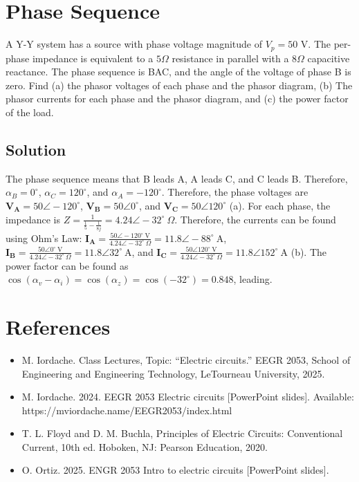 \documentclass{article}
\begin{document}
\section{Phase Sequence}
A Y-Y system has a source with phase voltage magnitude of $V_p = 50$ V. The per-phase impedance is equivalent to a $5\Omega$ resistance in parallel with a $8\Omega$ capacitive reactance. The phase sequence is BAC, and the angle of the voltage of phase B is zero. Find (a) the phasor voltages of each phase and the phasor diagram, (b) The phasor currents for each phase and the phasor diagram, and (c) the power factor of the load.
\subsection*{Solution}
The phase sequence means that B leads A, A leads C, and C leads B. Therefore, $\alpha_B = 0^\circ$, $\alpha_C = 120^\circ$, and $\alpha_A = -120^\circ$. Therefore, the phase voltages are $\bm{V_A} = 50\angle -120^\circ$, $\bm{V_B} = 50\angle 0^\circ$, and $\bm{V_C} = 50\angle 120^\circ$ (a). For each phase, the impedance is $Z = \frac{1}{\frac{1}{5} - \frac{1}{8j}} = 4.24\angle -32^\circ \ \Omega$. Therefore, the currents can be found using Ohm's Law:
$\bm{I_A} = \frac{50\angle -120^\circ \ \textrm{V}}{4.24\angle -32^\circ \ \Omega} = 11.8\angle -88^\circ \ \textrm{A}$, $\bm{I_B} = \frac{50\angle 0^\circ \ \textrm{V}}{4.24\angle -32^\circ \ \Omega} = 11.8\angle 32^\circ \ \textrm{A}$, and $\bm{I_C} = \frac{50\angle 120^\circ \ \textrm{V}}{4.24\angle -32^\circ \ \Omega} = 11.8\angle 152^\circ \ \textrm{A}$ (b). The power factor can be found as $\cos(\alpha_v - \alpha_i) = \cos(\alpha_z) = \cos(-32^\circ) = 0.848$, leading.


\newpage
\section*{References}
\begin{itemize}
\item M. Iordache. Class Lectures, Topic: ``Electric circuits.'' EEGR 2053, School of Engineering and Engineering Technology, LeTourneau University, 2025.
\item M. Iordache. 2024. EEGR 2053 Electric circuits [PowerPoint slides]. Available: \\ https://mviordache.name/EEGR2053/index.html
\item T. L. Floyd and D. M. Buchla, Principles of Electric Circuits: Conventional Current, 10th ed. Hoboken, NJ: Pearson Education, 2020.
\item O. Ortiz. 2025. ENGR 2053 Intro to electric circuits [PowerPoint slides].
\end{itemize}
\end{document}
